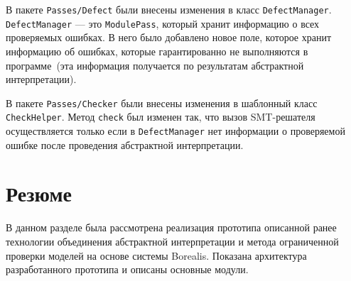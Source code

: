 В пакете \texttt{Passes/Defect} были внесены изменения в класс 
\texttt{DefectManager}. \texttt{DefectManager} --- это \texttt{ModulePass}, 
который хранит информацию о всех проверяемых ошибках. В него было добавлено
новое поле, которое хранит информацию об ошибках, которые гарантированно не выполняются в программе~(эта информация получается по результатам абстрактной
интерпретации).

В пакете \texttt{Passes/Checker} были внесены изменения в шаблонный класс
\texttt{CheckHelper}. Метод \texttt{check} был изменен так, что вызов SMT-решателя осуществляется только если в \texttt{DefectManager} нет информации
о проверяемой ошибке после проведения абстрактной интерпретации.

\section{Резюме}
В данном разделе была рассмотрена реализация прототипа описанной ранее 
технологии объединения абстрактной интерпретации и метода ограниченной проверки 
моделей на основе системы Borealis. Показана архитектура разработанного 
прототипа и описаны основные модули.